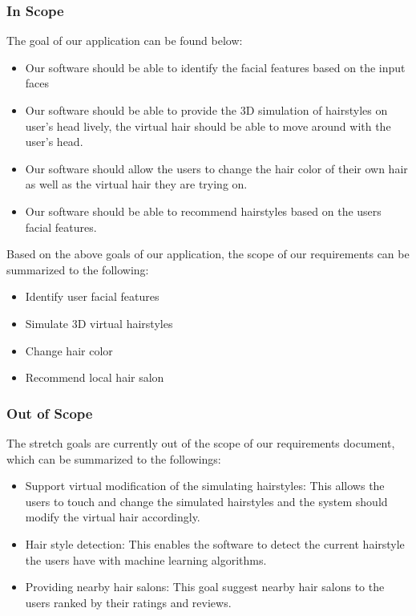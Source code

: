 \documentclass[12pt]{article}
\begin{document}
 \subsubsection{In Scope}
The goal of our application can be found below:
 \begin{itemize}
     \item Our software should be able to identify the facial features based on the input faces
     \item Our software should be able to provide the 3D simulation of hairstyles on user's head lively, the virtual hair should be able to move around with the user's head.
     \item Our software should allow the users to change the hair color of their own hair as well as the virtual hair they are trying on.
     \item Our software should be able to recommend hairstyles based on the users facial features.
 \end{itemize}
 
 \noindent
 Based on the above goals of our application, the scope of our requirements can be summarized to the following:
 \begin{itemize}
     \item Identify user facial features
     \item Simulate 3D virtual hairstyles
     \item Change hair color
     \item Recommend local hair salon
 \end{itemize}

\subsubsection{Out of Scope}

The stretch goals are currently out of the scope of our requirements document, which can be summarized to the followings:

\begin{itemize}
    \item Support virtual modification of the simulating hairstyles: This allows the users to touch and change the simulated hairstyles and the system should modify the virtual hair accordingly.
    \item Hair style detection: This enables the software to detect the current hairstyle the users have with machine learning algorithms.
    \item Providing nearby hair salons: This goal suggest nearby hair salons to the users ranked by their ratings and reviews.
\end{itemize}
\end{document}
